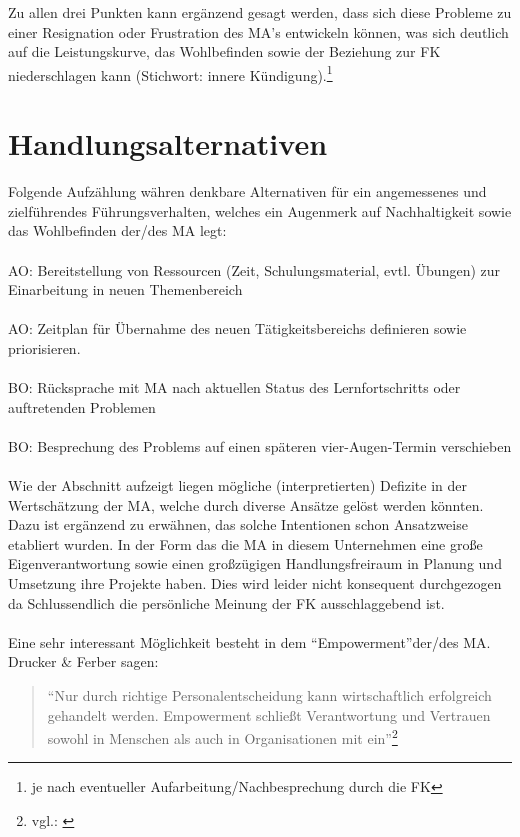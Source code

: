 Zu allen drei Punkten kann ergänzend gesagt werden, dass sich diese Probleme zu einer Resignation oder Frustration des \ac{MA}'s entwickeln können, was sich deutlich auf die Leistungskurve, das Wohlbefinden sowie der Beziehung zur \ac{FK} niederschlagen kann (Stichwort: innere Kündigung).\footnote{je nach eventueller Aufarbeitung/Nachbesprechung durch die \ac{FK} }

\section{Handlungsalternativen}
\label{sec:handlungsalternativen}

Folgende Aufzählung währen denkbare Alternativen für ein angemessenes und zielführendes Führungsverhalten, welches ein Augenmerk auf Nachhaltigkeit sowie das Wohlbefinden der/des \ac{MA} legt:\\
\\
\ac{AO}: Bereitstellung von Ressourcen (Zeit, Schulungsmaterial, evtl. Übungen) zur Einarbeitung in neuen Themenbereich \\
\\
\ac{AO}: Zeitplan für Übernahme des neuen Tätigkeitsbereichs definieren sowie priorisieren.\\
\\
\ac{BO}: Rücksprache mit \ac{MA} nach aktuellen Status des Lernfortschritts oder 
auftretenden Problemen \\
\\
\ac{BO}: Besprechung des Problems auf einen späteren vier-Augen-Termin verschieben\\
\\

Wie der Abschnitt  aufzeigt liegen mögliche (interpretierten) Defizite in der Wertschätzung der \ac{MA}, welche durch diverse Ansätze gelöst werden könnten. 
Dazu ist ergänzend zu erwähnen, das solche Intentionen schon Ansatzweise etabliert wurden. 
In der Form das die \ac{MA} in diesem Unternehmen eine große Eigenverantwortung sowie einen großzügigen Handlungsfreiraum in Planung und Umsetzung ihre Projekte haben.
Dies wird leider nicht konsequent durchgezogen da Schlussendlich die persönliche Meinung der \ac{FK} ausschlaggebend ist.\\
\\
Eine sehr interessant Möglichkeit besteht in dem "`Empowerment"'der/des \ac{MA}.
Drucker \& Ferber sagen: 

\begin{quote}
"`Nur durch richtige Personalentscheidung kann wirtschaftlich erfolgreich gehandelt werden. Empowerment schließt Verantwortung und Vertrauen sowohl in Menschen als auch in Organisationen mit ein"'\footnote{vgl.: \cite{Drucker2009}}
\end{quote}


